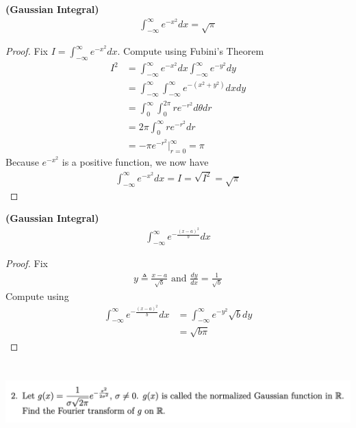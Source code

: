 \documentclass{report}
\begin{document}
\begin{theorem}
\label{Gau1} 
\textbf{(Gaussian Integral)} 
\begin{align*}
\int_{-\infty}^{\infty}e^{-x^2}dx=\sqrt{\pi} 
\end{align*}
\end{theorem}
\begin{proof}
Fix $I=\int_{-\infty}^{\infty}e^{-x^2}dx$. Compute using Fubini's Theorem 
\begin{align*}
I^2&=\int_{-\infty}^{\infty}e^{-x^2}dx\int_{-\infty}^{\infty}e^{-y^2}dy\\
&=\int_{-\infty}^{\infty}\int_{-\infty}^{\infty}e^{-(x^2+y^2)}dxdy\\
&=\int_0^{\infty}\int_{0}^{2\pi}re^{-r^2}d\theta dr\\
&=2\pi \int_0^{\infty}re^{-r^2}dr\\
&=-\pi e^{-r^2}\big|_{r=0}^{\infty}=\pi
\end{align*}
Because $e^{-x^2}$ is a positive function, we now have 
\begin{align*}
\int_{-\infty}^{\infty}e^{-x^2}dx=I=\sqrt{I^2}=\sqrt{\pi}  
\end{align*}
\end{proof}
\begin{theorem}
\label{Gau2}
\textbf{(Gaussian Integral)}
\begin{align*}
\int_{-\infty}^{\infty}e^{-\frac{(x-a)^2}{b}}dx
\end{align*}
\end{theorem}
\begin{proof}
Fix 
\begin{align*}
y\triangleq \frac{x-a}{\sqrt{b}}\text{ and }\frac{dy}{dx}=\frac{1}{\sqrt{b} }
\end{align*}
Compute using 
\begin{align*}
\int_{-\infty}^{\infty}e^{-\frac{(x-a)^2}{b}}dx&=\int_{-\infty}^{\infty}e^{-y^2}\sqrt{b} dy\\
&=\sqrt{b\pi} 
\end{align*}
\end{proof}
\begin{question}{}{}
\includegraphics[height=3cm,width=18cm]{hw3q2}
\end{question}
\end{document}
